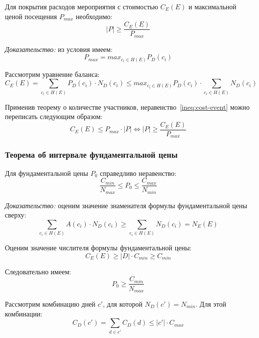 Для покрытия расходов мероприятия с стоимостью $C_E(E)$ и максимальной ценой посещения $P_{max}$ необходимо:
\begin{equation}
	|P| \ge \frac{C_E(E)}{P_{max}}
\end{equation}

\textit{Доказательство:} из условия имеем:
\begin{equation}
	P_{max} = max_{c_i \in H(E)}{P_D(c_i)}
\end{equation}

Рассмотрим уравнение баланса:
\begin{equation}
	C_E(E) = \sum_{c_i \in H(E)}{P_D(c_i) \cdot N_D(c_i)} \le max_{c_i \in H(E)}{P_D(c_i)} \cdot \sum_{c_i \in H(E)}{N_D(c_i)}
	\label{ineq:cost-event}
\end{equation}

Применив теорему о количестве участников, неравенство~\ref{ineq:cost-event} можно переписать следующим образом:
\begin{equation}
	C_E(E) \le P_{max} \cdot |P| \Leftrightarrow |P| \ge \frac{C_E(E)}{P_{max}}
\end{equation}

\subsubsection{Теорема об интервале фундаментальной цены}

Для фундаментальной цены $P_0$ справедливо неравенство:
\begin{equation}
	\frac{C_{min}}{N_{max}} \le P_0 \le \frac{C_{max}}{N_{min}}
\end{equation}

\textit{Доказательство:} оценим значение знаменателя формулы фундаментальной цены сверху:
\begin{equation}
	\sum_{c_i \in H(E)}{A(c_i) \cdot N_D(c_i)} \ge \sum_{c_i \in H(E)}{N_D(c_i)} = N_E(E)
\end{equation}

Оценим значение числителя формулы фундаментальной цены:
\begin{equation}
	C_E(E) \ge |D| \cdot C_{min} \ge C_{min}
\end{equation}

Следовательно имеем:
\begin{equation}
	P_0 \ge \frac{C_{min}}{N_{max}}
\end{equation}

Рассмотрим комбинацию дней $c'$, для которой $N_D(c') = N_{min}$. Для этой комбинации:
\begin{equation}
	C_D(c') = \sum_{d \in c'}{C_D(d)} \le |c'| \cdot C_{max}
\end{equation}


